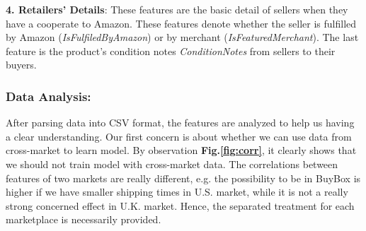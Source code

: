 \textbf{4. Retailers' Details}: These features are the basic detail of  sellers when they have a cooperate to Amazon. These features denote whether the seller is fulfilled by Amazon (\textit{IsFulfiledByAmazon}) or by merchant (\textit{IsFeaturedMerchant}). The last feature is the product's condition notes \textit{ConditionNotes} from sellers to their buyers.

\subsubsection{Data Analysis:}
\label{sec:dataanalysis}

After parsing data into CSV format, the features are analyzed to help us having a clear understanding. Our first concern is about whether we can use data from cross-market to learn model. By observation \textbf{Fig.\ref{fig:corr}}, it clearly shows that we should not train model with cross-market data. The correlations between features of two markets are really different, e.g. the possibility to be in BuyBox is higher if we have smaller shipping times in U.S. market, while it is not a really strong concerned effect in U.K. market. %
Hence, the separated treatment for each marketplace is necessarily provided.

